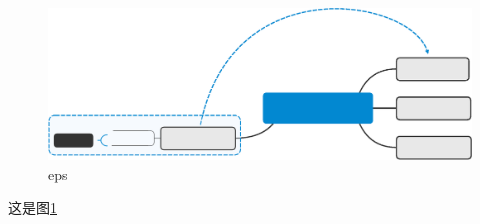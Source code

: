 \documentclass[UTF8]{ctexart}
\begin{document}
    \begin{figure}[h]
        \centering
        \includegraphics[scale=0.5  ]{Central_Topic.eps}
        \caption{eps}
        \label{eps}
    \end{figure}
     
这是图\ref{eps}
\end{document}
